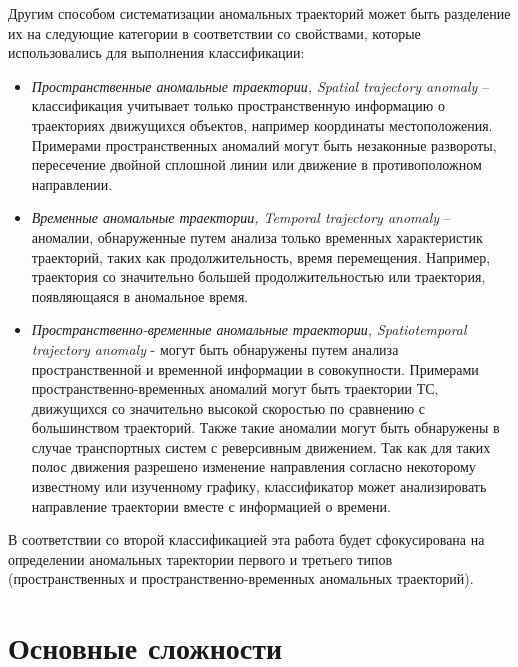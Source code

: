 Другим способом систематизации аномальных траекторий может быть разделение их на следующие категории в соответствии со свойствами, которые использовались для выполнения классификации:

\begin{itemize}
	\item \textit{Пространственные аномальные траектории, Spatial trajectory anomaly} -- классификация учитывает только пространственную информацию о траекториях движущихся объектов, например координаты местоположения. Примерами пространственных аномалий могут быть незаконные развороты, пересечение двойной сплошной линии или движение в противоположном направлении.
	\item \textit{Временные аномальные траектории, Temporal trajectory anomaly} -- аномалии, обнаруженные путем анализа только временных характеристик траекторий, таких как продолжительность, время перемещения. Например, траектория со значительно большей продолжительностью или траектория, появляющаяся в аномальное время.
	\item \textit{Пространственно-временные аномальные траектории, Spatiotemporal trajectory anomaly} - могут быть обнаружены путем анализа пространственной и временной информации в совокупности. Примерами пространственно-временных аномалий могут быть траектории ТС, движущихся со значительно высокой скоростью по сравнению с большинством траекторий. Также такие аномалии могут быть обнаружены в случае транспортных систем с реверсивным движением. Так как для таких полос движения разрешено изменение направления согласно некоторому известному или изученному графику, классификатор может анализировать направление траектории вместе с информацией о времени.
\end{itemize}

В соответствии со второй классификацией эта работа будет сфокусирована на определении аномальных таректории первого и третьего типов (пространственных и пространственно-временных аномальных траекторий).

\section{Основные сложности}

